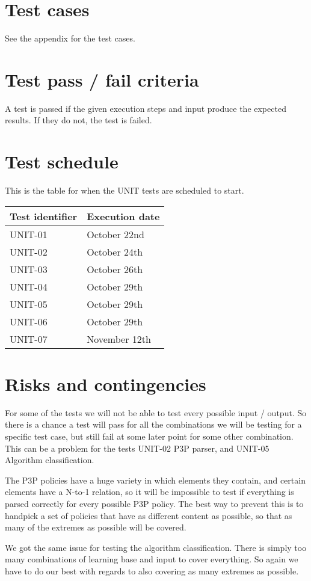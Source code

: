 	\section{Test cases}
		See the appendix for the test cases.

	\section{Test pass / fail criteria}
		A test is passed if the given execution steps and input produce the expected results. If they do not, the test is failed.

	\section {Test schedule}
		This is the table for when the UNIT tests are scheduled to start.

		\begin{center}
			\begin{tabular}{ |  p{5cm} | p{5cm} | }
				\hline
				Test identifier & Execution date \\ [3pt] \hline \hline
				UNIT-01 & October 22nd \\  [3pt] \hline
				UNIT-02 & October 24th \\  [3pt] \hline
				UNIT-03 & October 26th \\  [3pt] \hline
				UNIT-04 & October 29th \\  [3pt] \hline
				UNIT-05 & October 29th \\  [3pt] \hline
				UNIT-06 & October 29th \\  [3pt] \hline
				UNIT-07 & November 12th \\  [3pt] \hline
			\end{tabular}
		\end{center}

\section{Risks and contingencies}
For some of the tests we will not be able to test every possible input / output. So there is a chance a test will pass for all the combinations we will be testing for a specific test case, but still fail at some later point for some other combination. This can be a problem for the tests UNIT-02 P3P parser, and UNIT-05 Algorithm classification.

The P3P policies have a huge variety in which elements they contain, and certain elements have a N-to-1 relation, so it will be impossible to test if everything is parsed correctly for every possible P3P policy. The best way to prevent this is to handpick a set of policies that have as different content as possible, so that as many of the extremes as possible will be covered.

We got the same issue for testing the algorithm classification. There is simply too many combinations of learning base and input to cover everything. So again we have to do our best with regards to also covering as many extremes as possible.



